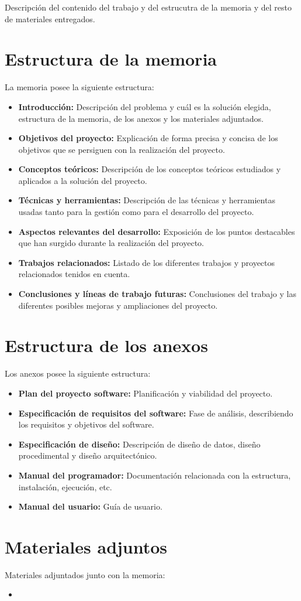 
Descripción del contenido del trabajo y del estrucutra de la memoria y del resto de materiales entregados.

\section{Estructura de la memoria}\label{estructura-de-la-memoria}
La memoria posee la siguiente estructura:
	\begin{itemize}
		\tightlist		
		\item
			\textbf{Introducción: }
			Descripción del problema y cuál es la solución elegida, estructura de la memoria, de los anexos y los materiales adjuntados.		
		\item
			\textbf{Objetivos del proyecto: }
			Explicación de forma precisa y concisa de los objetivos que se persiguen con la realización del proyecto.		
		\item
			\textbf{Conceptos teóricos: }
			Descripción de los conceptos teóricos estudiados y aplicados a la solución del proyecto.		
		\item
			\textbf{Técnicas y herramientas: }
			Descripción de las técnicas y herramientas usadas tanto para la gestión como para el desarrollo del proyecto.			
		\item
			\textbf{Aspectos relevantes del desarrollo: }
			Exposición de los puntos destacables que han surgido durante la realización del proyecto.			
		\item
			\textbf{Trabajos relacionados: }
			Listado de los diferentes trabajos y proyectos relacionados tenidos en cuenta.			
		\item
			\textbf{Conclusiones y líneas de trabajo futuras: }
			Conclusiones del trabajo y las diferentes posibles mejoras y ampliaciones del proyecto.
	\end{itemize}

\section{Estructura de los anexos}\label{estructura-de-los-anexos}
Los anexos posee la siguiente estructura:
	\begin{itemize}
		\tightlist		
		\item
			\textbf{Plan del proyecto software: }
			Planificación y viabilidad del proyecto.		
		\item
			\textbf{Especificación de requisitos del software: }
			Fase de análisis, describiendo los requisitos y objetivos del software.		
		\item
			\textbf{Especificación de diseño: }
			Descripción de diseño de datos, diseño procedimental y diseño arquitectónico.		
		\item
			\textbf{Manual del programador: }
			Documentación relacionada con la estructura, instalación, ejecución, etc. 
		\item
			\textbf{Manual del usuario: }
			Guía de usuario.	
	\end{itemize}

\section{Materiales adjuntos}\label{materiales-adjuntos}
Materiales adjuntados junto con la memoria:
	\begin{itemize}
		\tightlist		
		\item
	\end{itemize}
